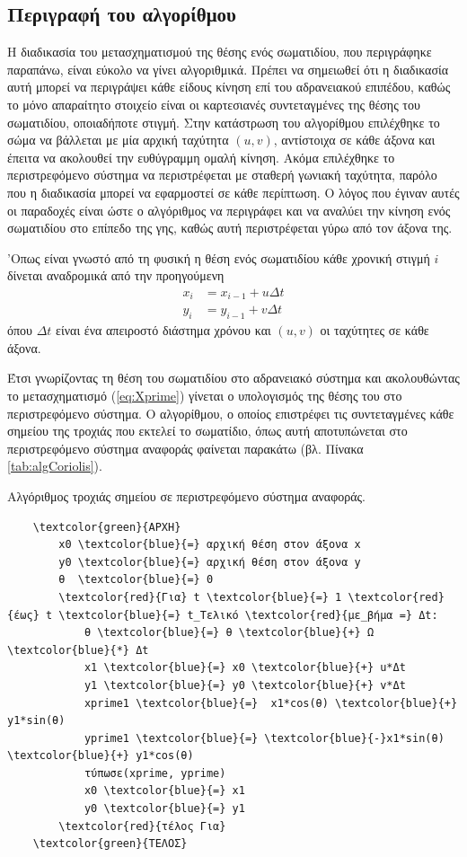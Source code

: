 \subsection{Περιγραφή του αλγορίθμου}
Η διαδικασία του μετασχηματισμού της θέσης ενός σωματιδίου, που περιγράφηκε παραπάνω, είναι εύκολο να γίνει αλγοριθμικά. Πρέπει να σημειωθεί ότι η διαδικασία αυτή μπορεί να περιγράψει κάθε είδους κίνηση επί του αδρανειακού επιπέδου, καθώς το μόνο απαραίτητο στοιχείο είναι οι καρτεσιανές συντεταγμένες της θέσης του σωματιδίου, οποιαδήποτε στιγμή. Στην κατάστρωση του αλγορίθμου επιλέχθηκε το σώμα να βάλλεται με μία αρχική ταχύτητα $(u, v)$, αντίστοιχα σε κάθε άξονα και έπειτα να ακολουθεί την ευθύγραμμη ομαλή κίνηση. Ακόμα επιλέχθηκε το περιστρεφόμενο σύστημα να περιστρέφεται με σταθερή γωνιακή ταχύτητα, παρόλο που η διαδικασία μπορεί να εφαρμοστεί σε κάθε περίπτωση. Ο λόγος που έγιναν αυτές οι παραδοχές είναι ώστε ο αλγόριθμος να περιγράφει και να αναλύει την κίνηση ενός σωματιδίου στο επίπεδο της γης, καθώς αυτή περιστρέφεται γύρω από τον άξονα της.

'Οπως είναι γνωστό από τη φυσική η θέση ενός σωματιδίου κάθε χρονική στιγμή $i$ δίνεται αναδρομικά από την προηγούμενη
\begin{align}
x_{i} &= x_{i-1}+u\Delta t \\
y_{i} &= y_{i-1}+v\Delta t
\end{align}
όπου $Δt$ είναι ένα απειροστό διάστημα χρόνου και $(u, v)$ οι ταχύτητες σε κάθε άξονα.

Έτσι γνωρίζοντας τη θέση του σωματιδίου στο αδρανειακό σύστημα και ακολουθώντας το μετασχηματισμό (\ref{eq:Xprime}) γίνεται ο υπολογισμός της θέσης του στο περιστρεφόμενο σύστημα. O αλγορίθμου, ο οποίος επιστρέφει τις συντεταγμένες κάθε σημείου της τροχιάς που εκτελεί το σωματίδιο, όπως αυτή αποτυπώνεται στο περιστρεφόμενο σύστημα αναφοράς φαίνεται παρακάτω (βλ. Πίνακα \ref{tab:algCoriolis}).
\begin{table}[h]
	\caption{Αλγόριθμος τροχιάς σημείου σε περιστρεφόμενο σύστημα αναφοράς.}
	\label{tab:algCoriolis}
	\begin{Verbatim}
	\textcolor{green}{ΑΡΧΗ}
	    x0 \textcolor{blue}{=} αρχική θέση στον άξονα x
	    y0 \textcolor{blue}{=} αρχική θέση στον άξονα y
	    θ  \textcolor{blue}{=} 0
	    \textcolor{red}{Για} t \textcolor{blue}{=} 1 \textcolor{red}{έως} t \textcolor{blue}{=} t_Τελικό \textcolor{red}{με_βήμα =} Δt:
	        θ \textcolor{blue}{=} θ \textcolor{blue}{+} Ω \textcolor{blue}{*} Δt
	        x1 \textcolor{blue}{=} x0 \textcolor{blue}{+} u*Δt
	        y1 \textcolor{blue}{=} y0 \textcolor{blue}{+} v*Δt
	        xprime1 \textcolor{blue}{=}  x1*cos(θ) \textcolor{blue}{+} y1*sin(θ)
	        yprime1 \textcolor{blue}{=} \textcolor{blue}{-}x1*sin(θ) \textcolor{blue}{+} y1*cos(θ)
	        τύπωσε(xprime, yprime)
	        x0 \textcolor{blue}{=} x1
	        y0 \textcolor{blue}{=} y1
	    \textcolor{red}{τέλος Για}
	\textcolor{green}{ΤΕΛΟΣ}
	\end{Verbatim}
\end{table}
\newpage

